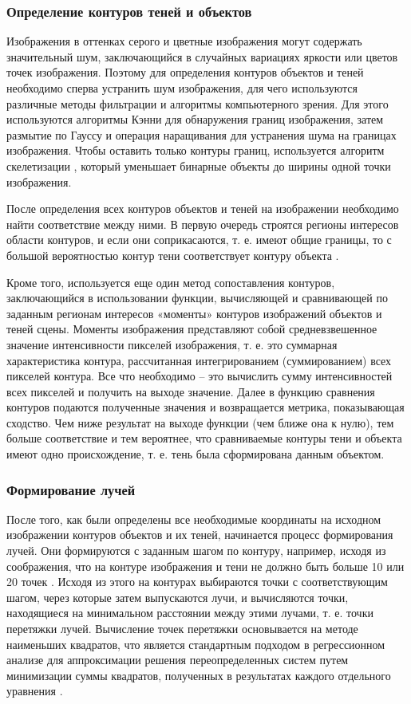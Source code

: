 \subsubsection*{Определение контуров теней и объектов}

Изображения в оттенках серого и цветные изображения могут содержать значительный шум, заключающийся в случайных вариациях яркости или цветов точек изображения. Поэтому для определения контуров объектов и теней необходимо сперва устранить шум изображения, для чего используются различные методы фильтрации и алгоритмы компьютерного зрения. Для этого используются алгоритмы Кэнни \cite{canedgedetect} для обнаружения границ изображения, затем размытие по Гауссу \cite{gaus_smooth} и операция наращивания \cite{dilation} для устранения шума на границах изображения. Чтобы оставить только контуры границ, используется алгоритм скелетизации \cite{skeleton}, который уменьшает бинарные объекты до ширины одной точки изображения. 

После определения всех контуров объектов и теней на изображении необходимо найти соответствие между ними. В первую очередь строятся регионы интересов \cite{roi} области контуров, и если они соприкасаются, т. е. имеют общие границы, то с большой вероятностью контур тени соответствует контуру объекта \cite{sns_tras}.

Кроме того, используется еще один метод сопоставления контуров, заключающийся в использовании функции, вычисляющей и сравнивающей по заданным регионам интересов «моменты» контуров изображений объектов и теней сцены. Моменты изображения представляют собой средневзвешенное значение интенсивности пикселей изображения, т. е. это суммарная характеристика контура, рассчитанная интегрированием (суммированием) всех пикселей контура. Все что необходимо -- это вычислить сумму интенсивностей всех пикселей и получить на выходе значение. Далее в функцию сравнения контуров подаются полученные значения и возвращается метрика, показывающая сходство. Чем ниже результат на выходе функции (чем ближе она к нулю), тем больше соответствие и тем вероятнее, что сравниваемые контуры тени и объекта имеют одно происхождение, т. е. тень была сформирована данным объектом.

\subsubsection*{Формирование лучей}

После того, как были определены все необходимые координаты на исходном изображении контуров объектов и их теней, начинается процесс формирования лучей. Они формируются с заданным шагом по контуру, например, исходя из соображения, что на контуре изображения и тени не должно быть больше 10 или 20 точек \cite{sns_tras}. Исходя из этого на контурах выбираются точки с соответствующим шагом, через которые затем выпускаются лучи, и вычисляются точки, находящиеся на минимальном расстоянии между этими лучами, т. е. точки перетяжки лучей. Вычисление точек перетяжки основывается на методе наименьших квадратов, что является стандартным подходом в регрессионном анализе для аппроксимации решения переопределенных систем путем минимизации суммы квадратов, полученных в результатах каждого отдельного уравнения \cite{mnk}.

